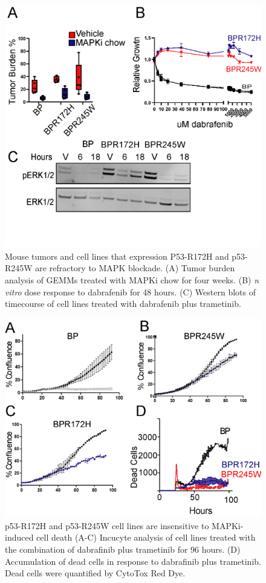 \begin{figure}
\hypertarget{fig:04}{%
\centering
\includegraphics[width=1\textwidth,height=\textheight]{images/p536.png}
\caption{Mouse tumors and cell lines that expression P53-R172H and p53-R245W are refractory to MAPK blockade. (A) Tumor burden analysis of GEMMs treated with MAPKi chow for four weeks. (B) \emph{n vitro} dose response to dabrafenib for 48 hours. (C) Western blots of timecourse of cell lines treated with dabrafenib plus trametinib.}\label{fig:04}
}
\end{figure}

\begin{figure}
\hypertarget{fig:04}{%
\centering
\includegraphics[width=1\textwidth,height=\textheight]{images/p537.png}
\caption{p53-R172H and p53-R245W cell lines are insensitive to MAPKi-induced cell death (A-C) Incucyte analysis of cell lines treated with the combination of dabrafinib plus trametinib for 96 hours. (D) Accumulation of dead cells in response to dabrafinib plus trametinib. Dead cells were quantified by CytoTox Red Dye.}\label{fig:04}
}
\end{figure}

